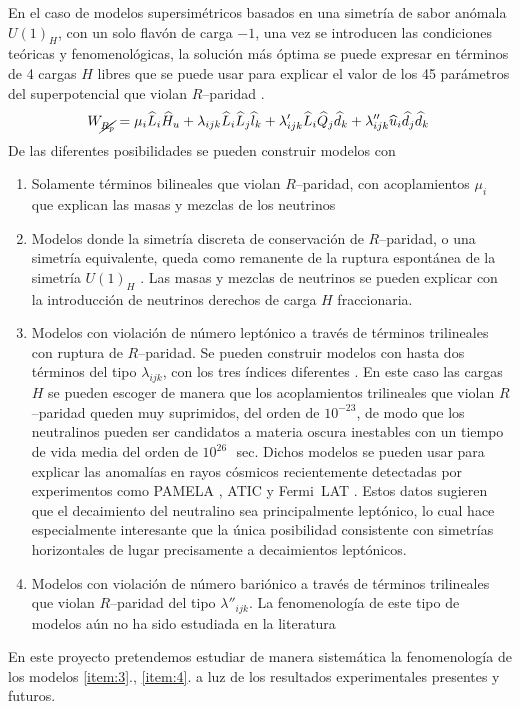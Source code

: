 En el caso de modelos supersimétricos basados en una simetría de sabor anómala $U(1)_H$, con un solo flavón de carga $-1$, una vez se introducen las condiciones teóricas y fenomenológicas, la solución más óptima se puede expresar en términos de 4 cargas $H$ libres que se puede usar para explicar el valor de los 45 parámetros del superpotencial que violan $R$--paridad \cite{Mira:2000gg,Dreiner:2003hw,Dreiner:2003yr,Dreiner:2007vp,Dreiner:2006xw,Sierra:2009zq}. 
\begin{equation}
  \label{eq:5}
  W_{\cancel{R_p}} = \mu_i\widehat{L}_i\widehat{H}_u +
  \lambda_{i j k}\widehat{L}_i\widehat{L}_j\widehat{l}_k +
  \lambda'_{i j k}\widehat{L}_i\widehat{Q}_j\widehat{d}_k +
  \lambda''_{ijk}\widehat{u}_i\widehat{d}_j\widehat{d}_k\,
\end{equation}
De las diferentes posibilidades se pueden construir modelos con
\begin{enumerate}
\item Solamente términos bilineales que violan $R$--paridad, con acoplamientos $\mu_i$ que explican las masas y mezclas de los neutrinos \cite{Mira:2000gg,Dreiner:2003hw,Dreiner:2006xw}
\label{item:1}
\item Modelos donde la simetría discreta de conservación de $R$--paridad, o una simetría equivalente, queda como remanente de la ruptura espontánea de la simetría $U(1)_H$ \cite{Dreiner:2003hw,Dreiner:2003yr,Dreiner:2007vp}. Las masas y mezclas de neutrinos se pueden explicar con la introducción de neutrinos derechos de carga $H$ fraccionaria.
\label{item:2}
\item Modelos con violación de número leptónico a través de términos trilineales con ruptura de $R$--paridad. Se pueden construir modelos con hasta dos términos del tipo $\lambda_{ijk}$, con los tres índices diferentes \cite{Sierra:2009zq}.  En este caso las cargas $H$ se pueden escoger de manera que los acoplamientos trilineales que violan $R$--paridad queden muy suprimidos, del orden de $10^{-23}$, de modo que los neutralinos pueden ser candidatos a materia oscura inestables con un tiempo de vida media del orden de $10^{26}\,$~sec. Dichos modelos se pueden usar para explicar las anomalías en rayos cósmicos \cite{Sierra:2009zq} recientemente detectadas por experimentos como PAMELA \cite{Adriani:2008zr}, ATIC \cite{:2008zzr} y Fermi~LAT \cite{Abdo:2009zk}. Estos datos sugieren que el decaimiento del neutralino sea principalmente leptónico, lo cual hace especialmente interesante que la única posibilidad consistente con simetrías horizontales de lugar precisamente a decaimientos leptónicos.
\label{item:3}
\item Modelos con violación de número bariónico a través de términos trilineales que violan $R$--paridad del tipo $\lambda''_{ijk}$. La fenomenología de este tipo de modelos aún no ha sido estudiada en la literatura
\label{item:4}
\end{enumerate}
En este proyecto pretendemos estudiar de manera sistemática la fenomenología de los modelos \ref{item:3}., \ref{item:4}. a luz de los resultados experimentales presentes y futuros.

